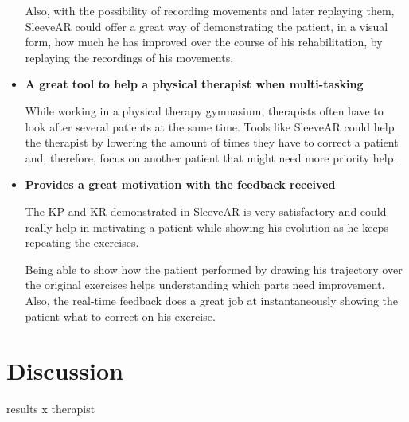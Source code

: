 \begin{itemize}
Also, with the possibility of recording movements and later replaying them, SleeveAR could offer a great way of demonstrating the patient, in a visual form, how much he has improved over the course of his rehabilitation, by replaying the recordings of his movements.

\item \textbf{A great tool to help a physical therapist when multi-tasking}

While working in a physical therapy gymnasium, therapists often have to look after several patients at the same time. Tools like SleeveAR could help the therapist by lowering the amount of times they have to correct a patient and, therefore, focus on another patient that might need more priority help.


\item \textbf{Provides a great motivation with the feedback received}

The \ac{KP} and \ac{KR} demonstrated in SleeveAR is very satisfactory and could really help in motivating a patient while showing his evolution as he keeps repeating the exercises.

Being able to show how the patient performed by drawing his trajectory over the original exercises helps understanding which parts need improvement. Also, the real-time feedback does a great job at instantaneously showing the patient what to correct on his exercise.

\end{itemize}

\section{Discussion}

results x therapist 